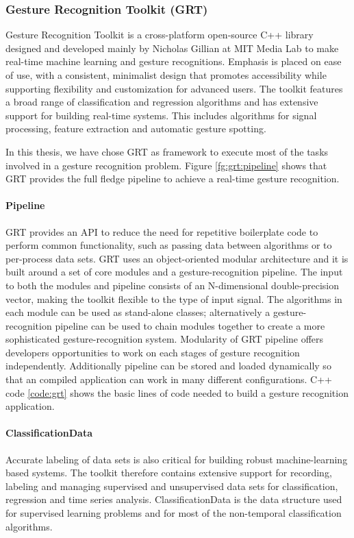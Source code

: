 \subsubsection{Gesture Recognition Toolkit (GRT)} \label{sec:grt} Gesture Recognition Toolkit is a cross-platform open-source C++ library designed and developed mainly by Nicholas Gillian at MIT Media Lab to make real-time machine learning and gesture recognitions. Emphasis is placed on ease of use, with a consistent, minimalist design that promotes accessibility while supporting flexibility and customization for advanced users. The toolkit features a broad range of classification and regression algorithms and has extensive support for building real-time systems. This includes algorithms for signal processing, feature extraction and automatic gesture spotting. 

In this thesis, we have chose GRT as framework to execute most of the tasks involved in a gesture recognition problem. Figure \ref{fg:grt:pipeline} shows that GRT provides the full fledge pipeline to achieve a real-time gesture recognition. 



\paragraph*{Pipeline} GRT provides an API to reduce the need for repetitive boilerplate code to perform common functionality, such as passing data between algorithms or to per-process data sets. GRT uses an object-oriented modular architecture and it is built around a set of core modules and a gesture-recognition pipeline. The input to both the modules and pipeline consists of an N-dimensional double-precision vector, making the toolkit flexible to the type of input signal. The algorithms in each module can be used as stand-alone classes; alternatively a gesture-recognition pipeline can be used to chain modules together to create a more sophisticated gesture-recognition system. Modularity of GRT pipeline offers developers opportunities to work on each stages of gesture recognition independently. Additionally pipeline can be stored and loaded dynamically so that an compiled application can work in many different configurations. C++ code \ref{code:grt} shows the basic lines of code needed to build a gesture recognition application.

 \label{code:grt}

\paragraph*{ClassificationData} Accurate labeling of data sets is also critical for building robust machine-learning based systems. The toolkit therefore contains extensive support for recording, labeling and managing supervised and unsupervised data sets for classification, regression and time series analysis. ClassificationData is the data structure used for supervised learning problems and for most of the non-temporal classification algorithms.


